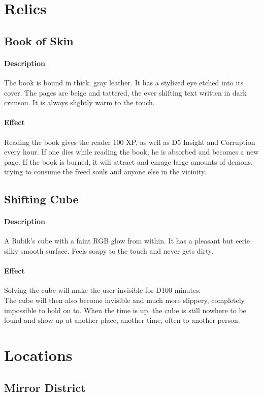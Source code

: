\section{Relics}
\subsection*{Book of Skin}
\paragraph{Description}
The book is bound in thick, gray leather.
It has a stylized eye etched into its cover.
The pages are beige and tattered,
	the ever shifting text written in dark crimson.
It is always slightly warm to the touch.
\paragraph{Effect}
Reading the book gives the reader
	100 XP, as well as D5 Insight and Corruption every hour.
If one dies while reading the book, he is absorbed and becomes a new page.
If the book is burned, it will attract and enrage large amounts of demons,
	trying to consume the freed souls and anyone else in the vicinity.
\subsection*{Shifting Cube}
\paragraph{Description}
A Rubik's cube with a faint RGB glow from within.
It has a pleasant but eerie silky smooth surface.
Feels soapy to the touch and never gets dirty.
\paragraph{Effect}
Solving the cube will make the user invisible for D100 minutes.
\\%
The cube will then also become invisible and much more slippery,
	completely impossible to hold on to.
When the time is up,
	the cube is still nowhere to be found
	and show up at another place, another time, often to another person.

\section{Locations}
\subsection*{Mirror District}
